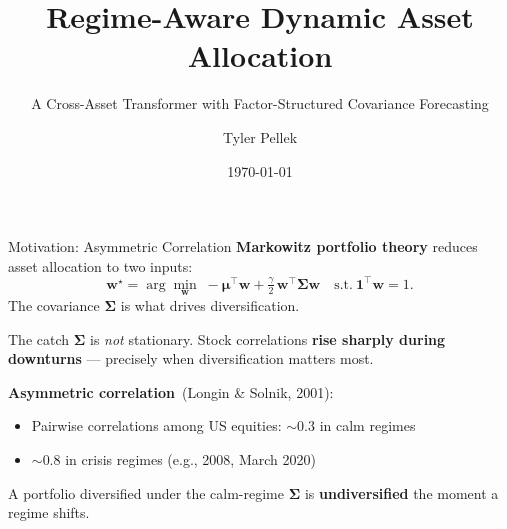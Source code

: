 \documentclass[10pt, aspectratio=169]{beamer}
\title{Regime-Aware Dynamic Asset Allocation}
\subtitle{A Cross-Asset Transformer with Factor-Structured Covariance Forecasting}
\author{Tyler Pellek}
\institute{Princeton University \\ \texttt{tp5523@princeton.edu}}
\date{\today}
\newcommand{\Sig}{\boldsymbol{\Sigma}}
\newcommand{\bmu}{\boldsymbol{\mu}}
\newcommand{\bw}{\mathbf{w}}
\begin{document}
\maketitle

\begin{frame}{Motivation: Asymmetric Correlation}
\textbf{Markowitz portfolio theory} reduces asset allocation to two inputs:
\[
\bw^\star = \arg\min_{\bw}\; -\bmu^\top \bw + \tfrac{\gamma}{2}\,\bw^\top \Sig \bw
\quad\text{s.t.}\ \mathbf{1}^\top \bw = 1.
\]
The covariance $\Sig$ is what drives diversification.
\vspace{0.4em}
\begin{alertblock}{The catch}
$\Sig$ is \emph{not} stationary. Stock correlations \textbf{rise sharply during downturns} --- precisely when diversification matters most.
\end{alertblock}
\vspace{0.3em}
\textbf{Asymmetric correlation} \,(Longin \& Solnik, 2001):
\begin{itemize}
  \item Pairwise correlations among US equities: $\sim 0.3$ in calm regimes
  \item $\sim 0.8$ in crisis regimes (e.g., 2008, March 2020)
\end{itemize}
A portfolio diversified under the calm-regime $\Sig$ is \textbf{undiversified} the moment a regime shifts.
\end{frame}
\end{document}
